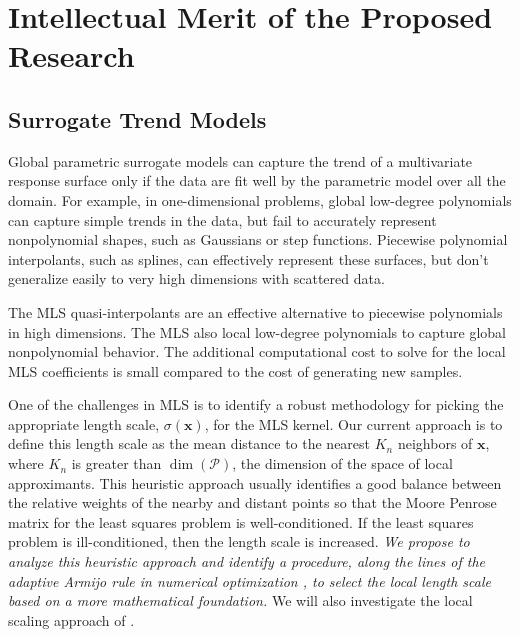 \documentclass[11pt]{NSFamsart}
\newcommand{\bx}{{\boldsymbol{x}}}
\newcommand{\calp}{{\mathcal{P}}}
\begin{document}
\section{Intellectual Merit of the Proposed Research} \label{sec:Proposed}


\subsection{Surrogate Trend Models} \label{sec:ourtrend}
Global parametric surrogate models can capture the trend of a multivariate response surface only if the data are fit well by the parametric model over all the domain. For example, in one-dimensional problems, global low-degree polynomials can capture simple trends in the data, but fail to accurately represent nonpolynomial shapes, such as Gaussians or step functions. Piecewise polynomial interpolants, such as splines, can effectively represent these surfaces, but don't generalize easily to very high dimensions with scattered data. 

The MLS quasi-interpolants are an effective alternative to piecewise polynomials in high dimensions. The MLS also local low-degree polynomials to capture global nonpolynomial behavior. The additional computational cost to solve for the local MLS coefficients is small compared to the cost of generating new samples. 

One of the challenges in MLS is to identify a robust methodology for picking the appropriate length scale, $\sigma(\bx)$, for the MLS kernel. Our current approach is to define this length scale as the mean distance to the nearest $K_n$ neighbors of $\bx$, where $K_n$ is greater than $\dim(\calp)$, the dimension of the space of local approximants.
This heuristic approach usually identifies a good balance between the relative weights of the nearby and distant points so that the Moore Penrose matrix for the least squares problem is well-conditioned. If the least squares problem is ill-conditioned, then the length scale is increased. \emph{We propose to analyze this heuristic approach and identify a procedure, along the lines of the adaptive Armijo rule in numerical optimization \cite{kelley1999iterative}, to select the local length scale based on a more mathematical foundation.}  We will also investigate the local scaling approach of \cite{ZelPer05a}.
\end{document}
